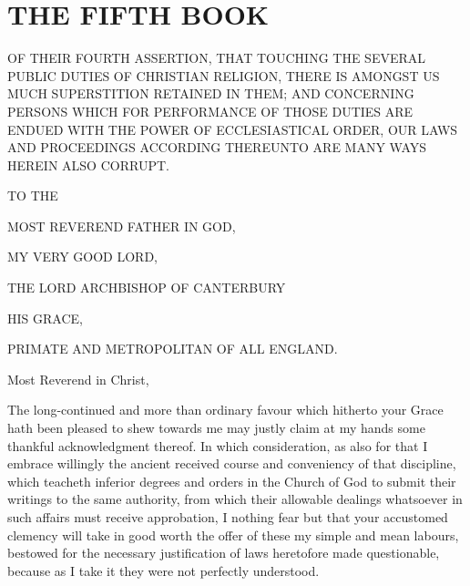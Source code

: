 
\chapter*[The Fifth Book]{THE FIFTH BOOK}
\label{chap:book5}

OF THEIR FOURTH ASSERTION, THAT TOUCHING THE SEVERAL PUBLIC DUTIES OF CHRISTIAN
RELIGION, THERE IS AMONGST US MUCH SUPERSTITION RETAINED IN THEM; AND CONCERNING
PERSONS WHICH FOR PERFORMANCE OF THOSE DUTIES ARE ENDUED WITH THE POWER OF
ECCLESIASTICAL ORDER, OUR LAWS AND PROCEEDINGS ACCORDING THEREUNTO ARE MANY WAYS
HEREIN ALSO CORRUPT.

\vspace*{2cm}

\PRLsep


\begin{center}
  TO THE  \par
  MOST REVEREND FATHER IN GOD,  \par
  MY VERY GOOD LORD,  \par
  THE LORD ARCHBISHOP OF CANTERBURY  \par
  HIS GRACE,  \par
  PRIMATE AND METROPOLITAN OF ALL ENGLAND.
\end{center}

\vspace*{1cm}

\noindent
Most Reverend in Christ,

\vspace*{0.5cm}

The long-continued and more than ordinary favour which hitherto your Grace hath been pleased to shew towards me may justly claim at my hands some thankful acknowledgment thereof. In which consideration, as also for that I embrace willingly the ancient received course and conveniency of that discipline, which teacheth inferior degrees and orders in the Church of God to submit their writings to the same authority, from which their allowable dealings whatsoever in such affairs must receive approbation, I nothing fear but that your accustomed clemency will take in good worth the offer of these my simple and mean labours, bestowed for the necessary justification of laws heretofore made questionable, because as I take it they were not perfectly understood.

